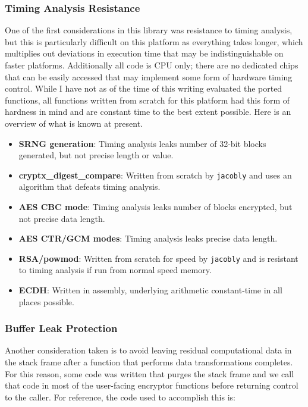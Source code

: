\documentclass[titlepage]{report}
\begin{document}
	\subsubsection{Timing Analysis Resistance}
	One of the first considerations in this library was resistance to timing analysis, but this is particularly difficult on this platform as everything takes longer, which multiplies out deviations in execution time that may be indistinguishable on faster platforms. Additionally all code is CPU only; there are no dedicated chips that can be easily accessed that may implement some form of hardware timing control. While I have not as of the time of this writing evaluated the ported functions, all functions written from scratch for this platform had this form of hardness in mind and are constant time to the best extent possible. Here is an overview of what is known at present.
	\begin{itemize}
		\item\textbf{SRNG generation}: Timing analysis leaks number of 32-bit blocks generated, but not precise length or value.
		\item\textbf{cryptx\_digest\_compare}: Written from scratch by \texttt{jacobly} and uses an algorithm that defeats timing analysis.
		\item\textbf{AES CBC mode}: Timing analysis leaks number of blocks encrypted, but not precise data length.
		\item\textbf{AES CTR/GCM modes}: Timing analysis leaks precise data length.
		\item\textbf{RSA/powmod}: Written from scratch for speed by \texttt{jacobly} and is resistant to timing analysis if run from normal speed memory.
		\item\textbf{ECDH}: Written in assembly, underlying arithmetic constant-time in all places possible.
	\end{itemize}
	
	\subsubsection{Buffer Leak Protection}
	Another consideration taken is to avoid leaving residual computational data in the stack frame after a function that performs data transformations completes. For this reason, some code was written that purges the stack frame and we call that code in most of the user-facing encryptor functions before returning control to the caller. For reference, the code used to accomplish this is:
	\inputminted{tasm}{code/stack_clear.asm}
\end{document}
